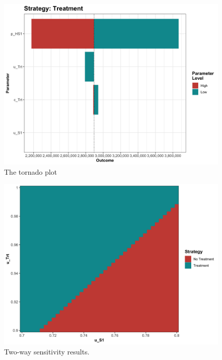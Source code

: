 \documentclass[]{book}
\begin{document}
\begin{figure}

{\centering \includegraphics[width=33.33in]{../figs/05a_tornado_Treatment_nmb} 

}

\caption{The tornado plot}\label{fig:05a-tornado-Treatment-nmb}
\end{figure}

\begin{figure}

{\centering \includegraphics[width=33.33in]{../figs/05a_twsa_uS1_uTrt_nmb} 

}

\caption{Two-way sensitivity results.}\label{fig:05a-twsa-uS1-uTrt-nmb}
\end{figure}
\end{document}
